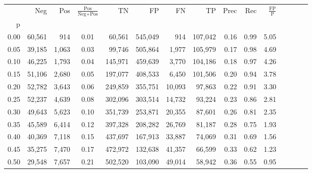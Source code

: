 \begin{tabular}{rrrcrrrrrrrrrrr}
\toprule
{} &     Neg &     Pos & $\frac{\text{Pos}}{\text{Neg}+\text{Pos}}$ &       TN &       FP &       FN &       TP &  Prec &   Rec & $\frac{\text{FP}}{\text{P}}$ \\
p    &         &         &                                            &          &          &          &          &       &       &                              \\
\midrule
0.00 &  60,561 &     914 &                                       0.01 &   60,561 &  545,049 &      914 &  107,042 &  0.16 &  0.99 &                         5.05 \\
0.05 &  39,185 &   1,063 &                                       0.03 &   99,746 &  505,864 &    1,977 &  105,979 &  0.17 &  0.98 &                         4.69 \\
0.10 &  46,225 &   1,793 &                                       0.04 &  145,971 &  459,639 &    3,770 &  104,186 &  0.18 &  0.97 &                         4.26 \\
0.15 &  51,106 &   2,680 &                                       0.05 &  197,077 &  408,533 &    6,450 &  101,506 &  0.20 &  0.94 &                         3.78 \\
0.20 &  52,782 &   3,643 &                                       0.06 &  249,859 &  355,751 &   10,093 &   97,863 &  0.22 &  0.91 &                         3.30 \\
0.25 &  52,237 &   4,639 &                                       0.08 &  302,096 &  303,514 &   14,732 &   93,224 &  0.23 &  0.86 &                         2.81 \\
0.30 &  49,643 &   5,623 &                                       0.10 &  351,739 &  253,871 &   20,355 &   87,601 &  0.26 &  0.81 &                         2.35 \\
0.35 &  45,589 &   6,414 &                                       0.12 &  397,328 &  208,282 &   26,769 &   81,187 &  0.28 &  0.75 &                         1.93 \\
0.40 &  40,369 &   7,118 &                                       0.15 &  437,697 &  167,913 &   33,887 &   74,069 &  0.31 &  0.69 &                         1.56 \\
0.45 &  35,275 &   7,470 &                                       0.17 &  472,972 &  132,638 &   41,357 &   66,599 &  0.33 &  0.62 &                         1.23 \\
0.50 &  29,548 &   7,657 &                                       0.21 &  502,520 &  103,090 &   49,014 &   58,942 &  0.36 &  0.55 &                         0.95 \\

\end{tabular}
